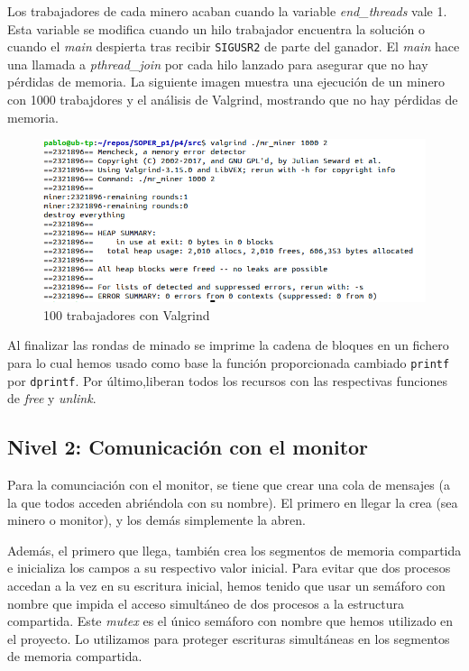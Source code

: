 \documentclass{article}
\begin{document}
    Los trabajadores de cada minero acaban cuando la variable \textit{end\_threads} vale 1. Esta variable se modifica cuando un hilo trabajador encuentra la solución o cuando el \textit{main} despierta tras recibir \texttt{SIGUSR2} de parte del ganador. El \textit{main} hace una llamada a \textit{pthread\_join} por cada hilo lanzado para asegurar que no hay pérdidas de memoria. La siguiente imagen muestra una ejecución de un minero con 1000 trabajdores y el análisis de Valgrind, mostrando que no hay pérdidas de memoria.

    \begin{figure}[h!]
        \centering
        \includegraphics[scale=.41]{./pruebas/valgrind_1000_trabajadores}
        \caption{100 trabajadores con Valgrind}
    \end{figure}


    
    Al finalizar las rondas de minado se imprime la cadena de bloques en un fichero para lo cual hemos usado como base la función proporcionada cambiado \texttt{printf} por \texttt{dprintf}. Por último,liberan todos los recursos con las respectivas funciones de \textit{free} y \textit{unlink}.

    

\subsection*{Nivel 2: Comunicación con el monitor}

    Para la comunciación con el monitor, se tiene que crear una cola de mensajes (a la que todos acceden abriéndola con su nombre). El primero en llegar la crea (sea minero o monitor), y los demás simplemente la abren.
    
    Además, el primero que llega, también crea los segmentos de memoria compartida e inicializa los campos a su respectivo valor inicial. Para evitar que dos procesos accedan a la vez en su escritura inicial, hemos tenido que usar un semáforo con nombre que impida el acceso simultáneo de dos procesos a la estructura compartida.
    Este \textit{mutex} es el único semáforo con nombre que hemos utilizado en el proyecto. Lo utilizamos para proteger escrituras simultáneas en los segmentos de memoria compartida.
\end{document}
